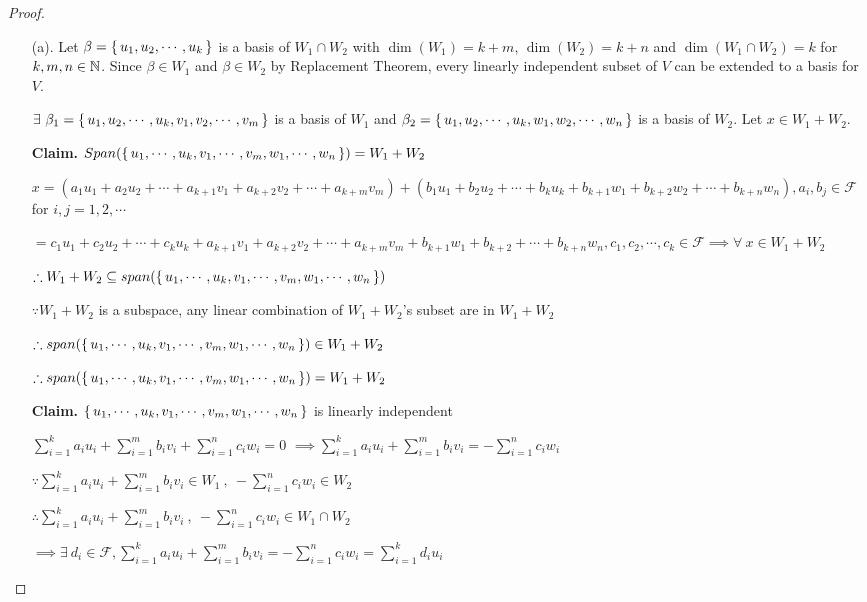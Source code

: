 \begin{proof}$ $

\begin{enumerate}
	\item[(a).] Let $\beta= \left\{ \,u_1,u_2,\cdots,u_k \,\right\}$ is a basis of $W_1 \cap W_2$ with $\dim(W_1) = k+m$, $\dim(W_2) = k+n$ and $\dim(W_1 \cap W_2) = k$ for $k,m,n \in \mathbb{N}$. Since $\beta \in W_1$ and $ \beta \in W_2$ by Replacement Theorem, every linearly independent subset of $V$ can be extended to a basis for $V$.
			
			$\exists~\beta_1 = \left\{ \,u_1, u_2,\cdots, u_k , v_1,v_2 , \cdots,v_m \,\right\}$ is a basis of $W_1$ and $\beta_2 = \left\{ \,u_1, u_2,\cdots,u_k,w_1,w_2,\cdots,w_n \,\right\}$ is a basis of $W_2$. Let $x \in W_1 + W_2$.
			
			\textbf{Claim.} $Span(\left\{ \,u_1,\cdots,u_k,v_1,\cdots,v_m,w_1,\cdots,w_n \,\right\}) = W_1 + W_2$
			
			$x = (a_1u_1 + a_2u_2 + \cdots + a_{k+1}v_1+a_{k+2}v_2 + \cdots + a_{k+m}v_m)+(b_1u_1+b_2u_2+\cdots+b_ku_k+b_{k+1}w_{1}+b_{k+2}w_2+\cdots+b_{k+n}w_n), a_i,b_j\in\mathcal{F}$ for $i ,j=1,2,\cdots$
			
			$=c_1u_1 + c_2u_2 + \cdots + c_ku_k + a_{k+1}v_1 + a_{k+2}v_2+\cdots + a_{k+m}v_m + b_{k+1}w_1 + b_{k+2} + \cdots + b_{k+n}w_n, c_1,c_2,\cdots,c_k \in \mathcal{F}\implies \forall~x \in W_1 + W_2 $ 
			
			$\therefore W_1 + W_2 \subseteq span(\left\{ \,u_1,\cdots,u_k,v_1,\cdots,v_m,w_1,\cdots,w_n \,\right\})$
			
			$\because W_1 + W_2$ is a subspace, any linear combination of $W_1 + W_2$'s subset are in $W_1 + W_2$
			
			$\therefore span(\left\{ \,u_1,\cdots,u_k,v_1,\cdots,v_m,w_1,\cdots,w_n \,\right\}) \in W_1 + W_2$
			
			$\therefore span(\left\{ \,u_1,\cdots,u_k,v_1,\cdots,v_m,w_1,\cdots,w_n \,\right\}) = W_1 + W_2$
			
			\textbf{Claim.} $\left\{ \,u_1,\cdots,u_k,v_1,\cdots,v_m,w_1,\cdots,w_n \,\right\}$ is linearly independent
			
			$\sum^k_{i=1}a_iu_i + \sum^m_{i=1}b_iv_i + \sum^n_{i=1}c_iw_i = 0$
			$\implies \sum^k_{i=1}a_iu_i + \sum^m_{i=1}b_iv_i = -\sum^n_{i=1}c_iw_i$
			
			$\because \sum^{k}_{i=1}a_iu_i + \sum^{m}_{i=1}b_iv_i \in W_1~,~ -\sum^n_{i=1}c_iw_i \in W_2$
			
			$\therefore \sum^k_{i=1}a_iu_i + \sum^m_{i=1}b_iv_i~,~-\sum^n_{i=1}c_iw_i \in W_1 \cap W_2$
			
			$\implies \exists~d_i \in \mathcal{F}, \sum^k_{i=1}a_iu_i + \sum^m_{i=1}b_iv_i = -\sum^n_{i=1}c_iw_i = \sum^k_{i=1}d_iu_i$
			

\end{enumerate}
\end{proof}
